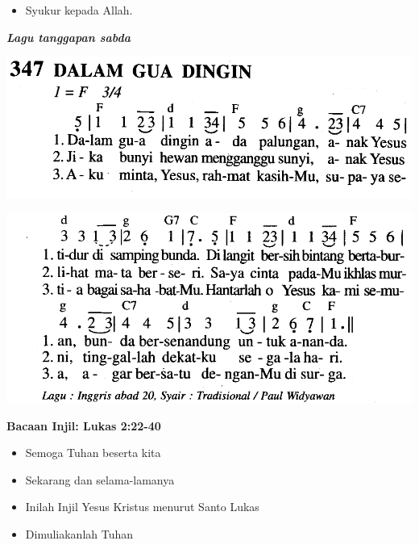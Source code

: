 \documentclass[a5paper,12pt,openany]{scrbook}
\makeatletter
\newcommand{\subjudul}[1]{%
  {\parindent \z@ \normalfont
    \interlinepenalty\@M \bfseries #1\par\nobreak \vskip 20\p@ }}
\newcommand{\lagu}[1]{%
  {\parindent \z@ \normalfont
    \interlinepenalty\@M \bfseries \emph{#1}\par\nobreak \vskip 20\p@ }}
\newcommand{\BU}[1]{\begin{itemize} \item[U:] #1 \end{itemize}}
\newcommand{\BI}[1]{\begin{itemize} \item[P:] #1 \end{itemize}}
\makeatother
\begin{document}
\BU{Syukur kepada Allah.}

\lagu{Lagu tanggapan sabda}

\includegraphics[scale=0.3]{mb347-dalam-gua-dingin-a.png}

\includegraphics[scale=0.3]{mb347-dalam-gua-dingin-b.png}

\subjudul{Bacaan Injil:  Lukas 2:22-40}

\BI{Semoga Tuhan beserta kita}

\BU{Sekarang dan selama-lamanya}

\BI{Inilah Injil Yesus Kristus menurut Santo Lukas}

\BU{Dimuliakanlah Tuhan}
\end{document}
